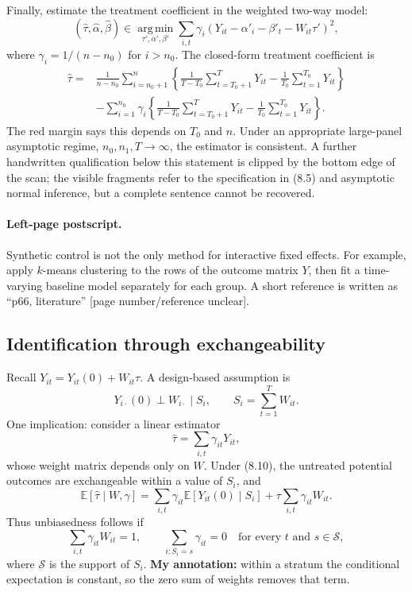 Finally, estimate the treatment coefficient in the weighted two-way model:
\[
 (\widehat\tau,\widehat\alpha,\widehat\beta)
 \in\operatorname*{arg\,min}_{\tau',\alpha',\beta'}
 \sum_{i,t}\gamma_i
 (Y_{it}-\alpha'_i-\beta'_t-W_{it}\tau')^2,\tag{8.8}
\]
where $\gamma_i=1/(n-n_0)$ for $i>n_0$. The closed-form treatment coefficient is
\begin{align*}
 \widehat\tau={}&\frac1{n-n_0}\sum_{i=n_0+1}^n
 \left\{\frac1{T-T_0}\sum_{t=T_0+1}^TY_{it}
 -\frac1{T_0}\sum_{t=1}^{T_0}Y_{it}\right\}\\
 &-\sum_{i=1}^{n_0}\gamma_i
 \left\{\frac1{T-T_0}\sum_{t=T_0+1}^TY_{it}
 -\frac1{T_0}\sum_{t=1}^{T_0}Y_{it}\right\}.
\end{align*}
The red margin says this depends on $T_0$ and $n$. Under an appropriate large-panel asymptotic regime, $n_0,n_1,T\to\infty$, the estimator is consistent. A further handwritten qualification below this statement is clipped by the bottom edge of the scan; the visible fragments refer to the specification in (8.5) and asymptotic normal inference, but a complete sentence cannot be recovered.

\paragraph{Left-page postscript.}
Synthetic control is not the only method for interactive fixed effects. For example, apply $k$-means clustering to the rows of the outcome matrix $Y$, then fit a time-varying baseline model separately for each group. A short reference is written as ``p66, literature'' [page number/reference unclear].

\subsection{Identification through exchangeability}
Recall $Y_{it}=Y_{it}(0)+W_{it}\tau$. A design-based assumption is
\[
 Y_{i\cdot}(0)\perp W_{i\cdot}\mid S_i,
 \qquad S_i=\sum_{t=1}^TW_{it}.\tag{8.10}
\]
One implication: consider a linear estimator
\[
 \widehat\tau=\sum_{i,t}\gamma_{it}Y_{it},\tag{8.11}
\]
whose weight matrix depends only on $W$. Under (8.10), the untreated potential outcomes are exchangeable within a value of $S_i$, and
\[
 \mathbb E[\widehat\tau\mid W,\gamma]
 =\sum_{i,t}\gamma_{it}\mathbb E[Y_{it}(0)\mid S_i]
 +\tau\sum_{i,t}\gamma_{it}W_{it}.
\]
Thus unbiasedness follows if
\[
 \sum_{i,t}\gamma_{it}W_{it}=1,
 \qquad
 \sum_{i:S_i=s}\gamma_{it}=0
 \quad\text{for every }t\text{ and }s\in\mathcal S,
\]
where $\mathcal S$ is the support of $S_i$. \textbf{My annotation:} within a stratum the conditional expectation is constant, so the zero sum of weights removes that term.

